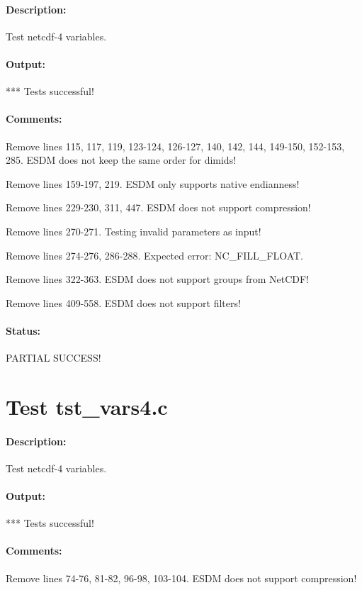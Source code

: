 \paragraph{Description:} Test netcdf-4 variables.

\paragraph{Output:} *** Tests successful!

\paragraph{Comments:} Remove lines 115, 117, 119, 123-124, 126-127, 140, 142, 144, 149-150, 152-153, 285. ESDM does not keep the same order for dimids!

Remove lines 159-197, 219. ESDM only supports native endianness!

Remove lines 229-230, 311, 447. ESDM does not support compression!

Remove lines 270-271. Testing invalid parameters as input!

Remove lines 274-276, 286-288. Expected error: NC\_FILL\_FLOAT.

Remove lines 322-363. ESDM does not support groups from NetCDF!

Remove lines 409-558. ESDM does not support filters!

\paragraph{Status:} PARTIAL SUCCESS!

\section{Test tst\_vars4.c}

\paragraph{Description:} Test netcdf-4 variables.

\paragraph{Output:} *** Tests successful!

\paragraph{Comments:} Remove lines 74-76, 81-82, 96-98, 103-104. ESDM does not support compression!

